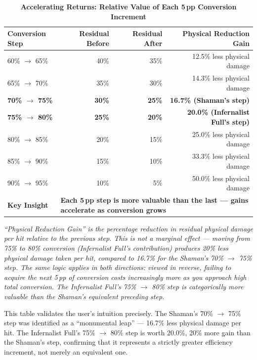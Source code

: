 \documentclass[12pt, letterpaper]{article}
\begin{document}
\begin{table}[htbp]
\centering
\caption{\textbf{Accelerating Returns: Relative Value of Each 5\,pp Conversion Increment}}
\begin{tabular}{lrrr}
\toprule
\textbf{Conversion Step} & \textbf{Residual Before} & \textbf{Residual After} & \textbf{Physical Reduction Gain} \\
\midrule
\rowcolor{rowalt} 60\% $\to$ 65\% & 40\% & 35\% & 12.5\% less physical damage \\
65\% $\to$ 70\% & 35\% & 30\% & 14.3\% less physical damage \\
\rowcolor{rowalt} \textbf{70\% $\to$ 75\%} & \textbf{30\%} & \textbf{25\%} & \textbf{16.7\% (Shaman's step)} \\
\textbf{75\% $\to$ 80\%} & \textbf{25\%} & \textbf{20\%} & \textbf{20.0\% (Infernalist Full's step)} \\
\rowcolor{rowalt} 80\% $\to$ 85\% & 20\% & 15\% & 25.0\% less physical damage \\
85\% $\to$ 90\% & 15\% & 10\% & 33.3\% less physical damage \\
\rowcolor{rowalt} 90\% $\to$ 95\% & 10\% & 5\% & 50.0\% less physical damage \\
\midrule
\rowcolor{rowhi} \textbf{Key Insight} & \multicolumn{3}{l}{\textbf{Each 5\,pp step is more valuable than the last --- gains accelerate as conversion grows}} \\
\bottomrule
\end{tabular}
\smallskip
\begin{minipage}{\linewidth}
\small\textit{``Physical Reduction Gain'' is the percentage reduction in residual physical damage per hit relative to the previous step. This is not a marginal effect --- moving from 75\% to 80\% conversion (Infernalist Full's contribution) produces 20\% less physical damage taken per hit, compared to 16.7\% for the Shaman's 70\% $\to$ 75\% step. The same logic applies in both directions: viewed in reverse, failing to acquire the next 5\,pp of conversion costs increasingly more as you approach high total conversion. The Infernalist Full's 75\% $\to$ 80\% step is categorically more valuable than the Shaman's equivalent preceding step.}
\end{minipage}
\end{table}

This table validates the user's intuition precisely. The Shaman's 70\% $\to$ 75\% step was identified as a ``monumental leap'' --- 16.7\% less physical damage per hit. The Infernalist Full's 75\% $\to$ 80\% step is worth 20.0\%, 20\% more gain than the Shaman's step, confirming that it represents a strictly greater efficiency increment, not merely an equivalent one.
\end{document}
